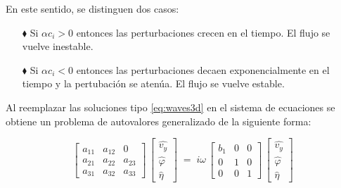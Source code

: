 En este sentido, se distinguen dos casos:

\begin{itemize}
\item[$\blacklozenge$] Si $\alpha c_i > 0$ entonces las perturbaciones crecen en el tiempo. El flujo se vuelve inestable.

\item[$\blacklozenge$] Si $\alpha c_i < 0$ entonces las perturbaciones decaen exponencialmente en el tiempo y la pertubación se atenúa. El flujo se vuelve estable.
\end{itemize}

Al reemplazar las soluciones tipo \ref{eq:waves3d} en el sistema de ecuaciones se obtiene un problema de autovalores generalizado de la siguiente forma:

\begin{equation}
\begin{bmatrix}
a_{11} & a_{12} & 0 \\[4pt]
a_{21} & a_{22} & a_{23} \\[4pt]
a_{31} & a_{32} & a_{33}
\end{bmatrix}
\,\begin{bmatrix}
\widehat{v_y} \\[4pt]
\widehat{\varphi} \\[4pt]
\widehat{\eta}
\end{bmatrix}
\;=\; i \omega
\,\begin{bmatrix}
  b_1 & 0 & 0 \\[4pt]
    0 & 1 & 0 \\[4pt]
    0 & 0 & 1
\end{bmatrix}
\,\begin{bmatrix}
\widehat{v_y} \\[4pt]
\widehat{\varphi} \\[4pt]
\widehat{\eta}
\end{bmatrix}
\end{equation}

